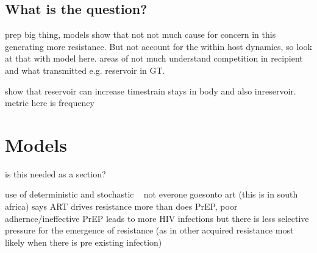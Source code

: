 \documentclass[DIV=15]{scrartcl}
\begin{document}
\subsection{What is the question?}
prep big thing, models show that not not much cause for concern in this generating more resistance. But not account for the within host dynamics, so look at that with model here. areas of not much understand competition in recipient and what transmitted e.g. reservoir in GT. 

show that reservoir can increase timestrain stays in body and also inreservoir. metric here is frequency

\fi



\iffalse

Also symptoms take 2-4 weeks to show up (cold/flu like stuff) and last a few weeks
\url{http://www.catie.ca/en/pif/fall-2010/detecting-hiv-earlier-advances-hiv-testing}

possible danger here is that if resistance is selected for during first stage of infection but not mke much difeerence 


is this needed as a section?
stuff about what drugs in PrEP\url{http://www.fda.gov/ForPatients/Illness/HIVAIDS/Treatment/ucm118915.htm} for e.g. elvitegravir (6 resistance mutations identified \url{http://www.ncbi.nlm.nih.gov/pubmed/23529738}) with large range of impacts on resistance    


, cobicistat, emtricitabine (m184v point mutation), tenofovir disoproxil fumarate (k65r point mutation)


most of the mutations that can happen \url{http://www.iasusa.org/sites/default/files/tam/21-1-6.pdf}


an HIV test is necessary before starting to use PrEP

But HIV test only works when??


Assume drug never is maximally effective due to incomplete penetration (need REF), so $C(t)<1$
\fi


\iffalse

\section{Models}
is this needed as a section?

use of  deterministic and stochastic ~\cite{abbas2013} not everone goesonto art (this is in south africa) says ART drives resistance more than does PrEP, poor adhernce/ineffective PrEP leads to more HIV infections but there is less  selective pressure for the emergence of  resistance (as in other acquired resistance most likely when there is pre existing infection)
\end{document}
